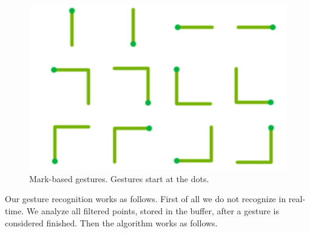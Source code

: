 \begin{figure}
 \includegraphics[scale=0.25]{images/markBasedGestures.jpg}
 \caption{Mark-based gestures. Gestures start at the dots. \cite{Bragdon}}
 \label{fig:markBasedGestures}
 \end{figure}Our gesture recognition works as follows. First of all we do not recognize in real-time. We analyze all filtered points, stored in the buffer, after a gesture is considered finished.  Then the algorithm works as follows.
